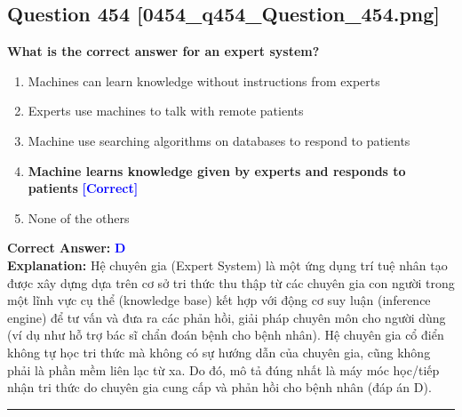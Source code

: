 \documentclass[11pt,a4paper]{article}
\begin{document}
\begin{minipage}{\textwidth}
\subsection*{Question 454 \quad \footnotesize{[0454\_q454\_Question\_454.png]}}
\noindent \textbf{What is the correct answer for an expert system?}

\begin{enumerate}[label=\Alph*.]
    \item Machines can learn knowledge without instructions from experts
    \item Experts use machines to talk with remote patients
    \item Machine use searching algorithms on databases to respond to patients
    \item \textbf{Machine learns knowledge given by experts and responds to patients} \hfill \textcolor{blue}{\textbf{[Correct]}}
    \item None of the others
\end{enumerate}

\noindent \textbf{Correct Answer:} \textcolor{blue}{\textbf{D}} \\[2pt]
\noindent \textbf{Explanation:} Hệ chuyên gia (Expert System) là một ứng dụng trí tuệ nhân tạo được xây dựng dựa trên cơ sở tri thức thu thập từ các chuyên gia con người trong một lĩnh vực cụ thể (knowledge base) kết hợp với động cơ suy luận (inference engine) để tư vấn và đưa ra các phản hồi, giải pháp chuyên môn cho người dùng (ví dụ như hỗ trợ bác sĩ chẩn đoán bệnh cho bệnh nhân). Hệ chuyên gia cổ điển không tự học tri thức mà không có sự hướng dẫn của chuyên gia, cũng không phải là phần mềm liên lạc từ xa. Do đó, mô tả đúng nhất là máy móc học/tiếp nhận tri thức do chuyên gia cung cấp và phản hồi cho bệnh nhân (đáp án D).

\par\vspace{0.3cm}
\hrule
\vspace{0.3cm}
\end{minipage}
\end{document}

